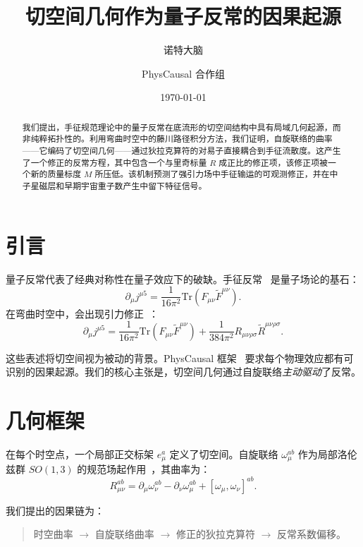 \documentclass{article}
\title{切空间几何作为量子反常的因果起源}
\author{诺特大脑 \and PhysCausal 合作组}
\date{\today}
\begin{document}
\maketitle

\begin{abstract}
我们提出，手征规范理论中的量子反常在底流形的切空间结构中具有局域几何起源，而非纯粹拓扑性的。利用弯曲时空中的藤川路径积分方法，我们证明，自旋联络的曲率——它编码了切空间几何——通过狄拉克算符的对易子直接耦合到手征流散度。这产生了一个修正的反常方程，其中包含一个与里奇标量 $R$ 成正比的修正项，该修正项被一个新的质量标度 $M$ 所压低。该机制预测了强引力场中手征输运的可观测修正，并在中子星磁层和早期宇宙重子数产生中留下特征信号。
\end{abstract}

\section{引言}

量子反常代表了经典对称性在量子效应下的破缺。手征反常~\cite{adler1969,bell1969} 是量子场论的基石：
\begin{equation}
\partial_\mu j^{\mu 5} = \frac{1}{16\pi^2} \text{Tr}(F_{\mu\nu} \tilde{F}^{\mu\nu}).
\label{eq:chiral}
\end{equation}
在弯曲时空中，会出现引力修正~\cite{alvarez1985}：
\begin{equation}
\partial_\mu j^{\mu 5} = \frac{1}{16\pi^2} \text{Tr}(F_{\mu\nu} \tilde{F}^{\mu\nu}) 
+ \frac{1}{384\pi^2} R_{\mu\nu\rho\sigma} \tilde{R}^{\mu\nu\rho\sigma}.
\label{eq:grav}
\end{equation}

这些表述将切空间视为被动的背景。PhysCausal 框架~\cite{physcausal2024} 要求每个物理效应都有可识别的因果起源。我们的核心主张是，切空间几何通过自旋联络\emph{主动驱动}了反常。

\section{几何框架}

在每个时空点，一个局部正交标架 $e^a_\mu$ 定义了切空间。自旋联络 $\omega^{ab}_\mu$ 作为局部洛伦兹群 $SO(1,3)$ 的规范场起作用~\cite{nakahara2003}，其曲率为：
\begin{equation}
R^{ab}_{\mu\nu} = \partial_\mu \omega^{ab}_\nu - \partial_\nu \omega^{ab}_\mu 
+ [\omega_\mu, \omega_\nu]^{ab}.
\label{eq:spin}
\end{equation}

我们提出的因果链为：
\begin{quote}
时空曲率 $\rightarrow$ 自旋联络曲率 $\rightarrow$ 
修正的狄拉克算符 $\rightarrow$ 反常系数偏移。
\end{quote}
\end{document}

